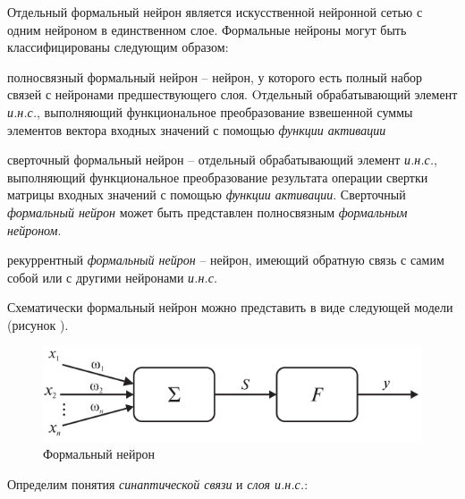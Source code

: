 Отдельный формальный нейрон является искусственной нейронной сетью с одним нейроном в единственном слое.
Формальные нейроны могут быть классифицированы следующим образом:
\begin{textitemize}
	\item полносвязный формальный нейрон -- нейрон, у которого есть полный набор связей с нейронами предшествующего слоя. Oтдельный обрабатывающий элемент \textit{и.н.с.}, выполняющий функциональное преобразование взвешенной суммы элементов вектора входных значений с помощью \textit{функции активации}
	\item сверточный формальный нейрон -- отдельный обрабатывающий элемент \textit{и.н.с.}, выполняющий функциональное преобразование результата операции свертки матрицы входных значений с помощью \textit{функции активации}. Сверточный \textit{формальный нейрон} может быть представлен полносвязным \textit{формальным нейроном}.
	\item рекуррентный \textit{формальный нейрон} -- нейрон, имеющий обратную связь с самим собой или с другими нейронами \textit{и.н.с.}
\end{textitemize}

Схематически формальный нейрон можно представить в виде следующей модели (рисунок \textit{}).

\begin{figure}[H]
	\centering
	\includegraphics[scale=0.4]{author/part3/figures/formal_neuron.png}
	\caption{Формальный нейрон}
	\label{fig:formal_neuron}
\end{figure}

Определим понятия \textit{синаптической связи} и \textit{слоя и.н.с.}:

\begin{SCn}

\end{SCn}

